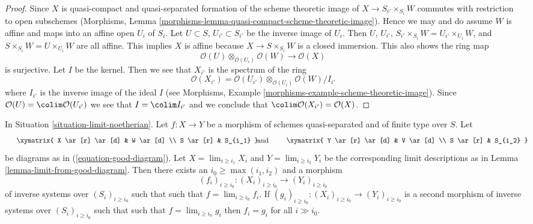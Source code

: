 \begin{proof}
Since $X$ is quasi-compact and quasi-separated formation of the
scheme theoretic image of $X \to S_{i'} \times_{S_i} W$
commutes with restriction to open subschemes
(Morphisms, Lemma \ref{morphisms-lemma-quasi-compact-scheme-theoretic-image}).
Hence we may and do assume $W$ is affine and maps into an affine open
$U_i$ of $S_i$. Let $U \subset S$, $U_{i'} \subset S_{i'}$
be the inverse image of $U_i$. Then $U$, $U_{i'}$, 
$S_{i'} \times_{S_i} W = U_{i'} \times_{U_i} W$, and
$S \times_{S_i} W = U \times_{U_i} W$ are all affine.
This implies $X$ is affine because $X \to S \times_{S_i} W$ is
a closed immersion. This also shows the ring map
$$
\mathcal{O}(U) \otimes_{\mathcal{O}(U_i)} \mathcal{O}(W) \to
\mathcal{O}(X)
$$
is surjective. Let $I$ be the kernel. Then we see that $X_{i'}$
is the spectrum of the ring
$$
\mathcal{O}(X_{i'}) =
\mathcal{O}(U_{i'}) \otimes_{\mathcal{O}(U_i)} \mathcal{O}(W)/I_{i'}
$$
where $I_{i'}$ is the inverse image of the ideal $I$ (see
Morphisms, Example \ref{morphisms-example-scheme-theoretic-image}).
Since $\mathcal{O}(U) = \colim \mathcal{O}(U_{i'})$
we see that $I = \colim I_{i'}$ and we conclude
that $\colim \mathcal{O}(X_{i'}) = \mathcal{O}(X)$.
\end{proof}

\begin{lemma}
\label{lemma-morphism-good-diagram}
In Situation \ref{situation-limit-noetherian}.
Let $f : X \to Y$ be a morphism of schemes quasi-separated
and of finite type over $S$. Let
$$
\vcenter{
\xymatrix{
X \ar[r] \ar[d] & W \ar[d] \\
S \ar[r] & S_{i_1}
}
}
\quad\text{and}\quad
\vcenter{
\xymatrix{
Y \ar[r] \ar[d] & V \ar[d] \\
S \ar[r] & S_{i_2}
}
}
$$
be diagrams as in (\ref{equation-good-diagram}). Let
$X = \lim_{i \geq i_1} X_i$ and
$Y = \lim_{i \geq i_2} Y_i$ be the corresponding
limit descriptions as in Lemma \ref{lemma-limit-from-good-diagram}.
Then there exists an $i_0 \geq \max(i_1, i_2)$ and a morphism
$$
(f_i)_{i \geq i_0} : (X_i)_{i \geq i_0} \to (Y_i)_{i \geq i_0}
$$
of inverse systems over $(S_i)_{i \geq i_0}$ such that
such that $f = \lim_{i \geq i_0} f_i$.
If $(g_i)_{i \geq i_0} : (X_i)_{i \geq i_0} \to (Y_i)_{i \geq i_0}$
is a second morphism of inverse systems over $(S_i)_{i \geq i_0}$ such that
such that $f = \lim_{i \geq i_0} g_i$
then $f_i = g_i$ for all $i \gg i_0$.
\end{lemma}


